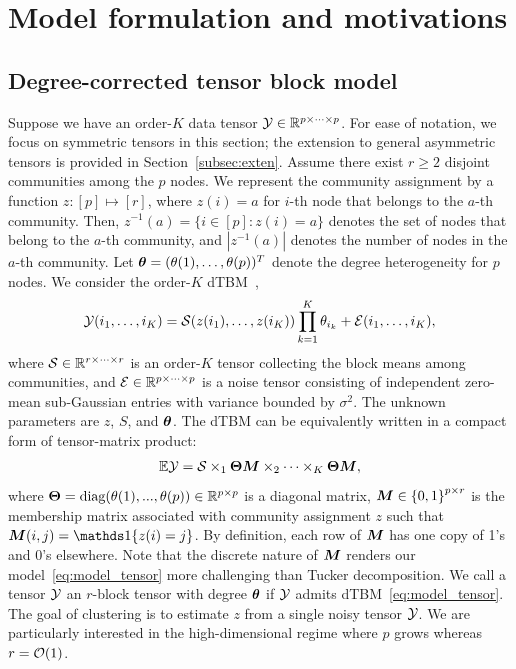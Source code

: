 \documentclass[lettersize,onecolumn,journal]{IEEEtran}
\theoremstyle{definition}
\theoremstyle{definition}
\newcommand{\offf}[1]{\left\{#1\right\}}
\begin{document}
\section{Model formulation and motivations}\label{sec:model}

\subsection{Degree-corrected tensor block model}

Suppose we have an order-$K$ data tensor $\mathcal{Y} \in \mathbb{R}^{p \times \cdots \times p}$. For ease of notation, we focus on symmetric tensors in this section; the extension to general asymmetric tensors is provided in Section~\ref{subsec:exten}. Assume there exist $r \geq 2$  disjoint communities among the $p$ nodes. We represent the community assignment by a function $z \colon [p]\mapsto[r]$, where $z(i) = a$ for $i$-th node that belongs to the $a$-th community. Then, $z^{-1}(a)=\{i\in[p]\colon z(i)=a\}$ denotes the set of nodes that belong to the $a$-th community, and $|z^{-1}(a)|$ denotes the number of nodes in the $a$-th community. Let $\boldsymbol{\theta}=(\theta(1),\ldots,\theta(p))^T$ denote the degree heterogeneity for $p$ nodes. We consider the order-$K$ dTBM~\citep{ghoshdastidar2017consistency,ke2019community},
\begin{equation}\label{eq:model_margin}
    \tY(i_1,\ldots,i_K) = \tS(z(i_1),\ldots,z(i_K)) \prod_{k = 1}^K\theta_{i_k} + \tE(i_1,\ldots,i_K), 
\end{equation}
\normalsize
where $\mathcal{S} \in \mathbb{R}^{r \times \cdots \times r}$ is an order-$K$ tensor collecting the block means among communities, and $\mathcal{E}\in\mathbb{R}^{p\times \cdots \times p}$ is a noise tensor consisting of independent zero-mean sub-Gaussian entries with variance bounded by $\sigma^2$. The unknown parameters are $z$, $S$, and $\boldsymbol{\theta}$. The dTBM can be equivalently written in a compact form of tensor-matrix product:
\begin{equation}\label{eq:model_tensor}
\bbE\tY = \tS \times_1 \mTheta \mM \times_2 \cdots \times_K  \mTheta \mM,
\end{equation}
where $\boldsymbol{\Theta} = \text{diag}(\theta(1),...,\theta(p)) \in \mathbb{R}^{p \times p}$ is a diagonal matrix, $\mM \in \offf{0,1}^{p \times r}$ is the membership matrix associated with community assignment $z$ such that $\mM(i,j)=\ind\{z(i)=j\}$. By definition, each row of $\bm M$ has one copy of 1's and 0's elsewhere. Note that the discrete nature of $\bm M$ renders our model~\eqref{eq:model_tensor} more challenging than Tucker decomposition. We call a tensor $\mathcal{Y}$ an $r$-block tensor with degree $\boldsymbol{\theta}$ if $\mathcal{Y}$ admits dTBM~\eqref{eq:model_tensor}. The goal of clustering is to estimate $z$ from a single noisy tensor $\mathcal{Y}$. We are particularly interested in the high-dimensional regime where $p$ grows whereas $r=\mathcal{O}(1)$. 
\end{document}
